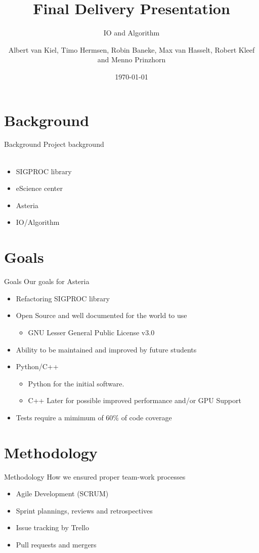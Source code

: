 \documentclass{beamer}
\title{Final Delivery Presentation}
\subtitle{IO and Algorithm}
\author{Albert van Kiel, Timo Hermsen, Robin Baneke, Max van Hasselt, Robert Kleef and Menno Prinzhorn}
\date{\today}
\begin{document}
\begin{frame}
    \titlepage
\end{frame}

\section{Background}
    
\begin{frame}{Background}
    Project background
    \\~\\
    \begin{itemize}
        \item SIGPROC library
        \item eScience center
        \item Asteria
        \item IO/Algorithm
    \end{itemize}
\end{frame}

\section{Goals}
\begin{frame}{Goals}
    Our goals for Asteria      
	\begin{itemize}
		\item Refactoring SIGPROC library
		\item Open Source and well documented for the world to use
		\begin{itemize}
			\item GNU Lesser General Public License v3.0
		\end{itemize}
		\item Ability to be maintained and improved by future students
        \item Python/C++
        \begin{itemize}
			\item Python for the initial software.
			\item C++ Later for possible improved performance and/or GPU Support
		\end{itemize}
        \item Tests require a mimimum of 60\% of code coverage
    \end{itemize}
\end{frame}

\section{Methodology}
	\begin{frame}{Methodology}
	How we ensured proper team-work processes
	\begin{itemize}
		\item Agile Development (SCRUM)
		\item Sprint plannings, reviews and retrospectives
		\item Issue tracking by Trello
		\item Pull requests and mergers
	\end{itemize}
\end{frame}
\end{document}
